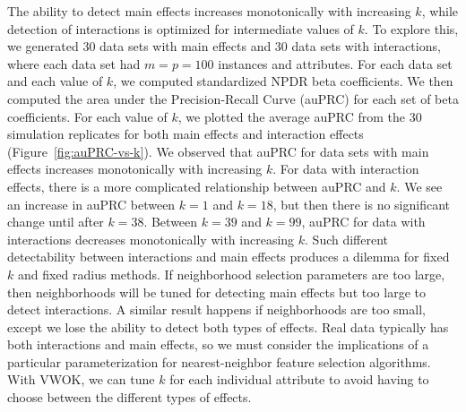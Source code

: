 \documentclass[10pt,letterpaper]{article}
\begin{document}
The ability to detect main effects increases monotonically with increasing $k$, while detection of interactions is optimized for intermediate values of $k$. To explore this, we generated 30 data sets with main effects and 30 data sets with interactions, where each data set had $m=p=100$ instances and attributes. For each data set and each value of $k$, we computed standardized NPDR beta coefficients. We then computed the area under the Precision-Recall Curve (auPRC) for each set of beta coefficients. For each value of $k$, we plotted the average auPRC from the 30 simulation replicates for both main effects and interaction effects (Figure~\ref{fig:auPRC-vs-k}). We observed that auPRC for data sets with main effects increases monotonically with increasing $k$. For data with interaction effects, there is a more complicated relationship between auPRC and $k$. We see an increase in auPRC between $k=1$ and $k=18$, but then there is no significant change until after $k=38$. Between $k=39$ and $k=99$, auPRC for data with interactions decreases monotonically with increasing $k$. Such different detectability between interactions and main effects produces a dilemma for fixed $k$ and fixed radius methods. If neighborhood selection parameters are too large, then neighborhoods will be tuned for detecting main effects but too large to detect interactions. A similar result happens if neighborhoods are too small, except we lose the ability to detect both types of effects. Real data typically has both interactions and main effects, so we must consider the implications of a particular parameterization for nearest-neighbor feature selection algorithms. With VWOK, we can tune $k$ for each individual attribute to avoid having to choose between the different types of effects.
\end{document}
